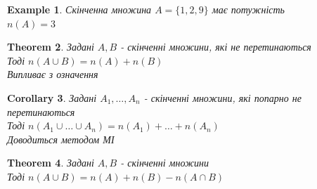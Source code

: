 \documentclass[a4paper, 14pt]{extarticle}
\theoremstyle{theoremdd}
\newtheorem{theorem}{Theorem}[subsection]
\theoremstyle{theoremdd}
\theoremstyle{theoremdd}
\theoremstyle{theoremdd}
\newtheorem{example}[theorem]{Example}
\theoremstyle{theoremdd}
\theoremstyle{theoremdd}
\theoremstyle{theoremdd}
\theoremstyle{theoremdd}
\newtheorem{corollary}[theorem]{Corollary}
\begin{document}
\begin{example}
Скінченна множина $A = \{1,2,9\}$ має потужність \\ $n(A) = 3$
\end{example}

\begin{theorem}
Задані $A,B$ - скінченні множини, які не перетинаються\\
Тоді $n(A \cup B) = n(A) + n(B)$\\
\textit{Випливає з означення}
\end{theorem}

\begin{corollary}
Задані $A_1,\dots,A_n$ - скінченні множини, які попарно не перетинаються\\
Тоді $n(A_1 \cup \dots \cup A_n) = n(A_1) + \dots + n(A_n)$\\
\textit{Доводиться методом МІ}
\end{corollary}

\begin{theorem}
Задані $A,B$ - скінченні множини\\
Тоді $n(A \cup B) = n(A) + n(B) - n(A \cap B)$
\end{theorem}
\end{document}
